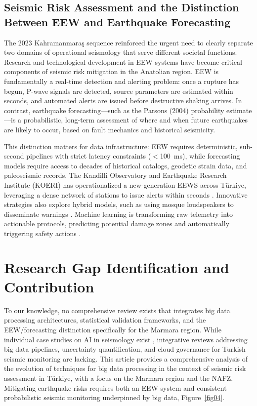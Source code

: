 \documentclass[data,article,accept,pdftex,moreauthors]{Definitions/mdpi}
\begin{document}
\subsection{Seismic Risk Assessment and the Distinction Between EEW and Earthquake Forecasting}

The 2023 Kahramanmara\c{s} sequence reinforced the urgent need to clearly separate two domains of operational seismology that serve different societal functions. Research and technological development in EEW systems have become critical components of seismic risk mitigation in the Anatolian region. EEW is fundamentally a real-time detection and alerting problem: once a rupture has begun, P-wave signals are detected, source parameters are estimated within seconds, and automated alerts are issued before destructive shaking arrives. In contrast, earthquake forecasting---such as the Parsons (2004) probability estimate---is a probabilistic, long-term assessment of where and when future earthquakes are likely to occur, based on fault mechanics and historical seismicity.

This distinction matters for data infrastructure: EEW requires deterministic, sub-second pipelines with strict latency constraints ($<$100~ms), while forecasting models require access to decades of historical catalogs, geodetic strain data, and paleoseismic records. The Kandilli Observatory and Earthquake Research Institute (KOERI) has operationalized a new-generation EEWS across Türkiye, leveraging a dense network of stations to issue alerts within seconds \cite{Ozeletal2026}. Innovative strategies also explore hybrid models, such as using mosque loudspeakers to disseminate warnings \cite{Eren2025}. Machine learning is transforming raw telemetry into actionable protocols, predicting potential damage zones and automatically triggering safety actions \cite{Specialeetal2026}.

\section{Research Gap Identification and Contribution}

To our knowledge, no comprehensive review exists that integrates big data processing architectures, statistical validation frameworks, and the EEW/forecasting distinction specifically for the Marmara region. While individual case studies on AI in seismology exist \cite{Bergen2019,Liuetal2026}, integrative reviews addressing big data pipelines, uncertainty quantification, and cloud governance for Turkish seismic monitoring are lacking. This article provides a comprehensive analysis of the evolution of techniques for big data processing in the context of seismic risk assessment in Türkiye, with a focus on the Marmara region and the NAFZ. Mitigating earthquake risks requires both an EEW system and consistent probabilistic seismic monitoring underpinned by big data, Figure~\ref{fig04}.
\end{document}
